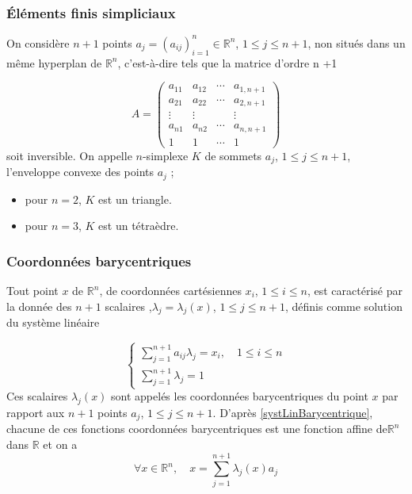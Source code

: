 \documentclass{beamer}
\begin{document}
\begin{frame}
\frametitle{Éléments finis simpliciaux}
On considère $n +1$ points $a_j=(a_{ij})_{i=1}^n\in \mathbb{R}^n$, $1\leq j \leq n+1$, non situés dans un même hyperplan de $\mathbb{R}^n$, c'est-à-dire tels que la matrice d'ordre n +1

\begin{equation}
A=\left(\begin{array}{llll}
a_{11} & a_{12} & \cdots & a_{1,n+1} \\ 
a_{21} & a_{22} & \cdots & a_{2,n+1} \\ 
\vdots& \vdots &  & \vdots \\ 
a_{n1} & a_{n2} & \cdots & a_{n,n+1} \\ 
1 & 1 & \cdots & 1
\end{array}\right)
\end{equation}
soit inversible. On appelle $n$-simplexe $K$ de sommets $a_j$, $1\leq j\leq n+1$,                                                                                                         l'enveloppe convexe des points $a_j$ ; 
\begin{itemize}
\item pour $n=2$, $K$ est un triangle.
\item pour $n = 3$, $K$ est un tétraèdre.
\end{itemize}
\end{frame}

\begin{frame}
\frametitle{Coordonnées barycentriques}
  Tout point $x$ de $\mathbb{R}^n$, de coordonnées cartésiennes $x_i$, $1\leq i\leq n$, est caractérisé par la donnée des $n+ 1$ scalaires ,$\lambda_j=\lambda_j(x)$, $1\leq j \leq n+1$, définis comme solution du système linéaire

\begin{equation}
\left\{\begin{array}{l}
\displaystyle \sum_{j=1}^{n+1}a_{ij}\lambda_j =x_i, \quad 1\leq i\leq n\\
\displaystyle \sum_{j=1}^{n+1}\lambda_j =1
\end{array}\right.
\label{systLinBarycentrique}
\end{equation}
Ces scalaires $\lambda_j(x)$ sont  appelés les coordonnées barycentriques du point $x$ par rapport aux $n+ 1$ points 
$a_j$, $1\leq j\leq n+1$. D'après \eqref{systLinBarycentrique}, chacune de ces fonctions coordonnées barycentriques est une fonction affine de$\mathbb{R}^n$ dans $\mathbb{R}$ et on a
\begin{equation}
\forall x\in\mathbb{R}^n,\quad x=\sum_{j=1}^{n+1}\lambda_j(x) a_{j}
\end{equation}
\end{frame}
\end{document}
